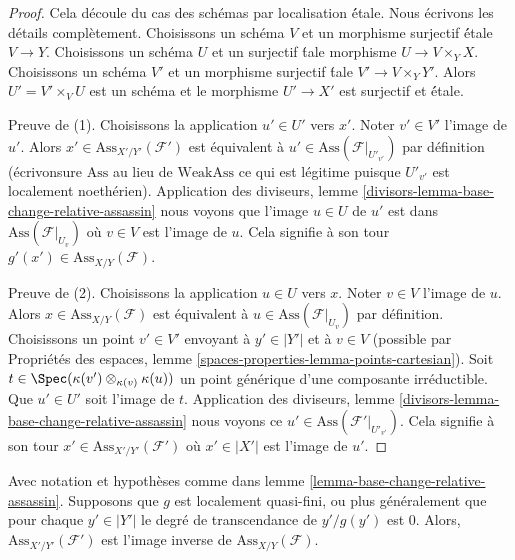 \begin{proof}
Cela découle du cas des schémas par localisation \'étale.
Nous écrivons les détails complètement. Choisissons un schéma
$V$ et un morphisme surjectif \'étale $V \to Y$.
Choisissons un schéma $U$ et un surjectif
\'tale morphisme $U \to V \times_Y X$. Choisissons un schéma $V'$
et un morphisme surjectif \'tale $V' \to V \times_Y Y'$.
Alors $U' = V' \times_V U$ est un schéma et le morphisme
$U' \to X'$ est surjectif et \'étale.

\medskip\noindent
Preuve de (1). Choisissons la application $u' \in U'$ vers $x'$.
Noter $v' \in V'$ l'image de $u'$.
Alors $x' \in \text{Ass}_{X'/Y'}(\mathcal{F}')$ est
équivalent à $u' \in \text{Ass}(\mathcal{F}|_{U'_{v'}})$
par définition (écrivonsure $\text{Ass}$ au lieu de $\text{WeakAss}$
ce qui est légitime puisque $U'_{v'}$ est localement noethérien).
Application des diviseurs, lemme \ref{divisors-lemma-base-change-relative-assassin}
nous voyons que l'image $u \in U$ de $u'$ est dans
$\text{Ass}(\mathcal{F}|_{U_v})$ où $v \in V$ est l'image de $u$.
Cela signifie à son tour $g'(x') \in \text{Ass}_{X/Y}(\mathcal{F})$.

\medskip\noindent
Preuve de (2). Choisissons la application $u \in U$ vers $x$.
Noter $v \in V$ l'image de $u$.
Alors $x \in \text{Ass}_{X/Y}(\mathcal{F})$ est
équivalent à $u \in \text{Ass}(\mathcal{F}|_{U_v})$
par définition. Choisissons un point $v' \in V'$ envoyant
à $y' \in |Y'|$ et à $v \in V$ (possible par
Propriétés des espaces, lemme \ref{spaces-properties-lemma-points-cartesian}).
Soit $t \in \Spec(\kappa(v') \otimes_{\kappa(v)} \kappa(u))$
un point générique d'une composante irréductible.
Que $u' \in U'$ soit l'image de $t$.
Application des diviseurs, lemme \ref{divisors-lemma-base-change-relative-assassin}
nous voyons ce $u' \in \text{Ass}(\mathcal{F}'|_{U'_{v'}})$.
Cela signifie à son tour $x' \in \text{Ass}_{X'/Y'}(\mathcal{F}')$
où $x' \in |X'|$ est l'image de $u'$.
\end{proof}

\begin{lemma}
\label{lemma-base-change-relative-assassin-quasi-finite}
Avec notation et hypothèses comme dans
lemme \ref{lemma-base-change-relative-assassin}.
Supposons que $g$ est localement quasi-fini, ou plus généralement que
pour chaque $y' \in |Y'|$ le degré de transcendance de $y'/g(y')$ est $0$.
Alors, $\text{Ass}_{X'/Y'}(\mathcal{F}')$ est l'image inverse de
$\text{Ass}_{X/Y}(\mathcal{F})$.
\end{lemma}

